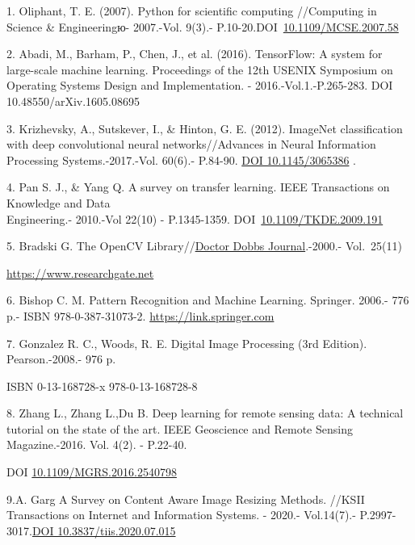 \begin{references}
1. Oliphant, T. E. (2007). Python for scientific computing //Computing in
Science \& Engineeringю- 2007.-Vol. 9(3).-
P.10-20.DOI~\href{https://doi.org/10.1109/MCSE.2007.58}{10.1109/MCSE.2007.58}

2. Abadi, M., Barham, P., Chen, J., et al. (2016). TensorFlow: A system
for large-scale machine learning. Proceedings of the 12th USENIX
Symposium on Operating Systems Design and Implementation. -
2016.-Vol.1.-P.265-283. DOI 10.48550/arXiv.1605.08695

3. Krizhevsky, A., Sutskever, I., \& Hinton, G. E. (2012). ImageNet
classification with deep convolutional neural networks//Advances in
Neural Information Processing Systems.-2017.-Vol. 60(6).- P.84-90.
\href{https://dl.acm.org/doi/10.1145/3065386}{DOI 10.1145/3065386} .

4. Pan S. J., \& Yang Q. A survey on transfer learning. IEEE
Transactions on Knowledge and Data \\Engineering.- 2010.-Vol 22(10) -
P.1345-1359.
DOI~\href{https://doi.org/10.1109/TKDE.2009.191}{10.1109/TKDE.2009.191}

5. Bradski G. The OpenCV
Library//\href{https://www.researchgate.net/journal/Doctor-Dobbs-Journal-1044-789X?_tp=eyJjb250ZXh0Ijp7ImZpcnN0UGFnZSI6InB1YmxpY2F0aW9uIiwicGFnZSI6InB1YmxpY2F0aW9uIn19}{Doctor
Dobbs Journal}.-2000.- Vol.~25(11)

\href{https://www.researchgate.net/publication/233950935_The_Opencv_Library}{https://www.researchgate.net}

6. Bishop C. M. Pattern Recognition and Machine Learning. Springer.
2006.- 776 p.- ISBN 978-0-387-31073-2.
\href{https://link.springer.com/book/9780387310732}{https://link.springer.com}

7. Gonzalez R. C., Woods, R. E. Digital Image Processing (3rd Edition).
Pearson.-2008.- 976 p.

ISBN 0-13-168728-x 978-0-13-168728-8

8. Zhang L., Zhang L.,Du B. Deep learning for remote sensing data: A
technical tutorial on the state of the art. IEEE Geoscience and Remote
Sensing Magazine.-2016. Vol. 4(2). - P.22-40.

DOI
\href{http://dx.doi.org/10.1109/MGRS.2016.2540798}{10.1109/MGRS.2016.2540798}

9.A. Garg A Survey on Content Aware Image Resizing Methods. //KSII
Transactions on Internet and Information Systems. - 2020.- Vol.14(7).-
P.2997-3017.\href{https://doi.org/10.3837/tiis.2020.07.015}{DOI
10.3837/tiis.2020.07.015}


\end{references}
